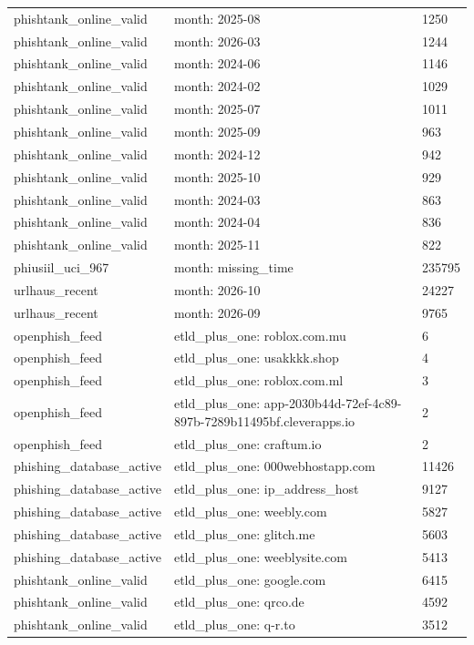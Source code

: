 \begin{tabular}{lll}
phishtank\_online\_valid & month: 2025-08 & 1250 \\
phishtank\_online\_valid & month: 2026-03 & 1244 \\
phishtank\_online\_valid & month: 2024-06 & 1146 \\
phishtank\_online\_valid & month: 2024-02 & 1029 \\
phishtank\_online\_valid & month: 2025-07 & 1011 \\
phishtank\_online\_valid & month: 2025-09 & 963 \\
phishtank\_online\_valid & month: 2024-12 & 942 \\
phishtank\_online\_valid & month: 2025-10 & 929 \\
phishtank\_online\_valid & month: 2024-03 & 863 \\
phishtank\_online\_valid & month: 2024-04 & 836 \\
phishtank\_online\_valid & month: 2025-11 & 822 \\
phiusiil\_uci\_967 & month: missing\_time & 235795 \\
urlhaus\_recent & month: 2026-10 & 24227 \\
urlhaus\_recent & month: 2026-09 & 9765 \\
openphish\_feed & etld\_plus\_one: roblox.com.mu & 6 \\
openphish\_feed & etld\_plus\_one: usakkkk.shop & 4 \\
openphish\_feed & etld\_plus\_one: roblox.com.ml & 3 \\
openphish\_feed & etld\_plus\_one: app-2030b44d-72ef-4c89-897b-7289b11495bf.cleverapps.io & 2 \\
openphish\_feed & etld\_plus\_one: craftum.io & 2 \\
phishing\_database\_active & etld\_plus\_one: 000webhostapp.com & 11426 \\
phishing\_database\_active & etld\_plus\_one: ip\_address\_host & 9127 \\
phishing\_database\_active & etld\_plus\_one: weebly.com & 5827 \\
phishing\_database\_active & etld\_plus\_one: glitch.me & 5603 \\
phishing\_database\_active & etld\_plus\_one: weeblysite.com & 5413 \\
phishtank\_online\_valid & etld\_plus\_one: google.com & 6415 \\
phishtank\_online\_valid & etld\_plus\_one: qrco.de & 4592 \\
phishtank\_online\_valid & etld\_plus\_one: q-r.to & 3512 \\

\end{tabular}
